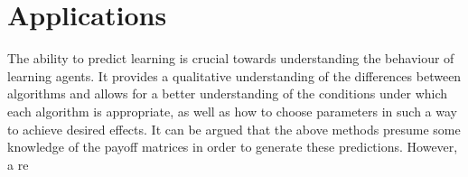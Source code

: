 \documentclass[../sample.tex]{subfiles}
\begin{document}

    \section{Applications}

    The ability to predict learning is crucial towards understanding the behaviour of learning
    agents. It provides a qualitative understanding of the differences between algorithms and allows
    for a better understanding of the conditions under which each algorithm is appropriate, as well
    as how to choose parameters in such a way to achieve desired effects. It can be argued
    that the above methods presume some knowledge of the payoff matrices in order to generate these
    predictions. However, a re
    
\end{document}
